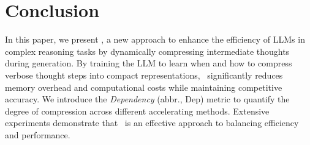 \section{Conclusion}
In this paper, we present \ours, a new approach to enhance the efficiency of LLMs in complex reasoning tasks by dynamically compressing intermediate thoughts during generation. 
By training the LLM to learn when and how to compress verbose thought steps into compact representations, \ours~significantly reduces memory overhead and computational costs while maintaining competitive accuracy. 
We introduce the \textit{Dependency} (abbr., Dep) metric to quantify the degree of compression across different accelerating methods.
Extensive experiments demonstrate that \ours~is an effective approach to balancing efficiency and performance. 




